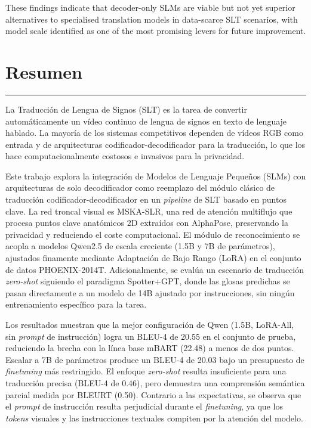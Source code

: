 \documentclass[a4paper, 11pt]{book}
\begin{document}
These findings indicate that decoder-only SLMs are viable but not yet superior alternatives to specialised translation models in data-scarce SLT scenarios, with model scale identified as one of the most promising levers for future improvement.
\newpage
\mbox{}
\thispagestyle{empty}


\newpage
{}
\section*{Resumen}
\vspace{-0.25cm}
\hrule
\vspace{0.5cm}
La Traducción de Lengua de Signos (SLT) es la tarea de convertir automáticamente un vídeo continuo de lengua de signos en texto de lenguaje hablado.
La mayoría de los sistemas competitivos dependen de vídeos RGB como entrada y de arquitecturas codificador-decodificador para la traducción, lo que los hace computacionalmente costosos e invasivos para la privacidad.

Este trabajo explora la integración de Modelos de Lenguaje Pequeños (SLMs) con arquitecturas de solo decodificador como reemplazo del módulo clásico de traducción codificador-decodificador en un \textit{pipeline} de SLT basado en puntos clave.
La red troncal visual es MSKA-SLR, una red de atención multiflujo que procesa puntos clave anatómicos $2$D extraídos con AlphaPose, preservando la privacidad y reduciendo el coste computacional.
El módulo de reconocimiento se acopla a modelos Qwen2.5 de escala creciente (1.5B y 7B de parámetros), ajustados finamente mediante Adaptación de Bajo Rango (LoRA) en el conjunto de datos PHOENIX-2014T.
Adicionalmente, se evalúa un escenario de traducción \textit{zero-shot} siguiendo el paradigma Spotter+GPT, donde las glosas predichas se pasan directamente a un modelo de 14B ajustado por instrucciones, sin ningún entrenamiento específico para la tarea.

Los resultados muestran que la mejor configuración de Qwen (1.5B, LoRA-All, sin \textit{prompt} de instrucción) logra un BLEU-4 de 20.55 en el conjunto de prueba, reduciendo la brecha con la línea base mBART (22.48) a menos de dos puntos.
Escalar a 7B de parámetros produce un BLEU-4 de 20.03 bajo un presupuesto de \textit{finetuning} más restringido.
El enfoque \textit{zero-shot} resulta insuficiente para una traducción precisa (BLEU-4 de 0.46), pero demuestra una comprensión semántica parcial medida por BLEURT (0.50).
Contrario a las expectativas, se observa que el \textit{prompt} de instrucción resulta perjudicial durante el \textit{finetuning}, ya que los \textit{tokens} visuales y las instrucciones textuales compiten por la atención del modelo.
\end{document}
